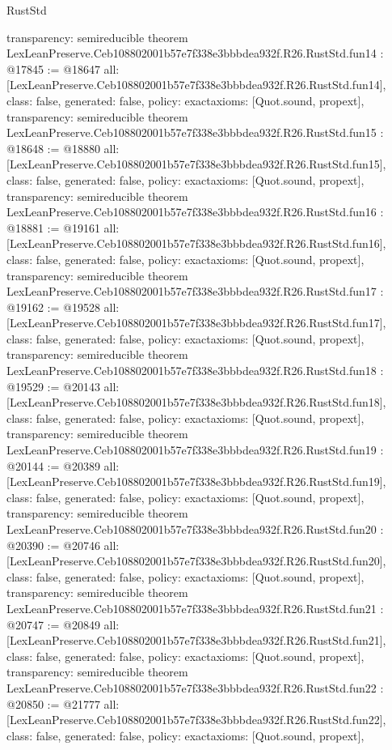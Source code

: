 \begin{lexlean}{RustStd}
\begin{coremodule}
{  transparency: semireducible
}
theorem LexLeanPreserve.Ceb108802001b57e7f338e3bbbdea932f.R26.RustStd.fun14 : @17845 := @18647 {
  all: [LexLeanPreserve.Ceb108802001b57e7f338e3bbbdea932f.R26.RustStd.fun14],
  class: false,
  generated: false,
  policy: exact{axioms: [Quot.sound, propext]},
  transparency: semireducible
}
theorem LexLeanPreserve.Ceb108802001b57e7f338e3bbbdea932f.R26.RustStd.fun15 : @18648 := @18880 {
  all: [LexLeanPreserve.Ceb108802001b57e7f338e3bbbdea932f.R26.RustStd.fun15],
  class: false,
  generated: false,
  policy: exact{axioms: [Quot.sound, propext]},
  transparency: semireducible
}
theorem LexLeanPreserve.Ceb108802001b57e7f338e3bbbdea932f.R26.RustStd.fun16 : @18881 := @19161 {
  all: [LexLeanPreserve.Ceb108802001b57e7f338e3bbbdea932f.R26.RustStd.fun16],
  class: false,
  generated: false,
  policy: exact{axioms: [Quot.sound, propext]},
  transparency: semireducible
}
theorem LexLeanPreserve.Ceb108802001b57e7f338e3bbbdea932f.R26.RustStd.fun17 : @19162 := @19528 {
  all: [LexLeanPreserve.Ceb108802001b57e7f338e3bbbdea932f.R26.RustStd.fun17],
  class: false,
  generated: false,
  policy: exact{axioms: [Quot.sound, propext]},
  transparency: semireducible
}
theorem LexLeanPreserve.Ceb108802001b57e7f338e3bbbdea932f.R26.RustStd.fun18 : @19529 := @20143 {
  all: [LexLeanPreserve.Ceb108802001b57e7f338e3bbbdea932f.R26.RustStd.fun18],
  class: false,
  generated: false,
  policy: exact{axioms: [Quot.sound, propext]},
  transparency: semireducible
}
theorem LexLeanPreserve.Ceb108802001b57e7f338e3bbbdea932f.R26.RustStd.fun19 : @20144 := @20389 {
  all: [LexLeanPreserve.Ceb108802001b57e7f338e3bbbdea932f.R26.RustStd.fun19],
  class: false,
  generated: false,
  policy: exact{axioms: [Quot.sound, propext]},
  transparency: semireducible
}
theorem LexLeanPreserve.Ceb108802001b57e7f338e3bbbdea932f.R26.RustStd.fun20 : @20390 := @20746 {
  all: [LexLeanPreserve.Ceb108802001b57e7f338e3bbbdea932f.R26.RustStd.fun20],
  class: false,
  generated: false,
  policy: exact{axioms: [Quot.sound, propext]},
  transparency: semireducible
}
theorem LexLeanPreserve.Ceb108802001b57e7f338e3bbbdea932f.R26.RustStd.fun21 : @20747 := @20849 {
  all: [LexLeanPreserve.Ceb108802001b57e7f338e3bbbdea932f.R26.RustStd.fun21],
  class: false,
  generated: false,
  policy: exact{axioms: [Quot.sound, propext]},
  transparency: semireducible
}
theorem LexLeanPreserve.Ceb108802001b57e7f338e3bbbdea932f.R26.RustStd.fun22 : @20850 := @21777 {
  all: [LexLeanPreserve.Ceb108802001b57e7f338e3bbbdea932f.R26.RustStd.fun22],
  class: false,
  generated: false,
  policy: exact{axioms: [Quot.sound, propext]},
}
\end{coremodule}
\end{lexlean}
